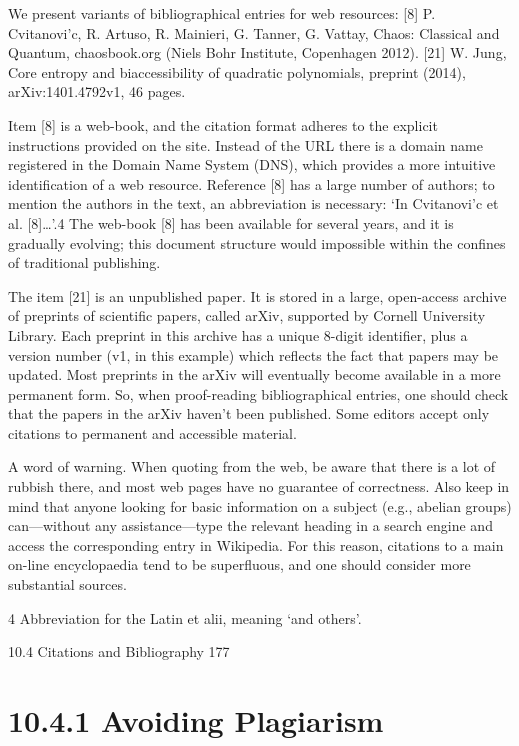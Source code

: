\documentclass[11pt]{article}
\theoremstyle{plain}
\theoremstyle{definition}
\begin{document}
We present variants of bibliographical entries for web resources: [8] P. Cvitanovi'c, R. Artuso, R. Mainieri, G. Tanner, G. Vattay, Chaos: Classical and Quantum, chaosbook.org (Niels Bohr Institute, Copenhagen 2012). [21] W. Jung, Core entropy and biaccessibility of quadratic polynomials, preprint (2014), arXiv:1401.4792v1, 46 pages.

Item [8] is a web-book, and the citation format adheres to the explicit instructions provided on the site. Instead of the URL there is a domain name registered in the Domain Name System (DNS), which provides a more intuitive identification of a web resource. Reference [8] has a large number of authors; to mention the authors in the text, an abbreviation is necessary: `In Cvitanovi'c et al. [8]\dots{}'.4 The web-book [8] has been available for several years, and it is gradually evolving; this document structure would impossible within the confines of traditional publishing.

The item [21] is an unpublished paper. It is stored in a large, open-access archive of preprints of scientific papers, called arXiv, supported by Cornell University Library. Each preprint in this archive has a unique 8-digit identifier, plus a version number (v1, in this example) which reflects the fact that papers may be updated. Most preprints in the arXiv will eventually become available in a more permanent form. So, when proof-reading bibliographical entries, one should check that the papers in the arXiv haven't been published. Some editors accept only citations to permanent and accessible material.

A word of warning. When quoting from the web, be aware that there is a lot of rubbish there, and most web pages have no guarantee of correctness. Also keep in mind that anyone looking for basic information on a subject (e.g., abelian groups) can---without any assistance---type the relevant heading in a search engine and access the corresponding entry in Wikipedia. For this reason, citations to a main on-line encyclopaedia tend to be superfluous, and one should consider more substantial sources.

4 Abbreviation for the Latin et alii, meaning `and others'.

10.4 Citations and Bibliography 177

\section{10.4.1 Avoiding Plagiarism}
\end{document}
